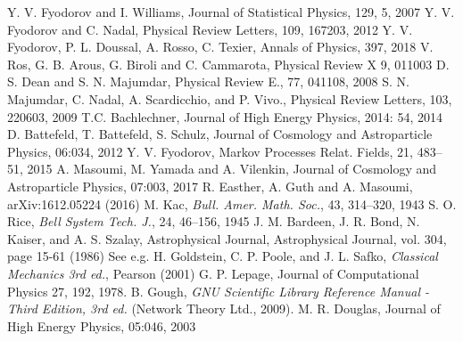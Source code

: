 \documentclass[12pt]{article}
\begin{document}
\begin{thebibliography}{99}
 Y. V. Fyodorov and I. Williams, Journal of Statistical Physics, 129, 5, 2007
 Y. V. Fyodorov and C. Nadal, Physical Review Letters, 109, 167203, 2012
 Y. V. Fyodorov, P. L. Doussal, A. Rosso, C. Texier, Annals of Physics, 397, 2018
  V. Ros, G. B. Arous, G. Biroli and C. Cammarota, Physical Review X 9, 011003
 D. S. Dean and S. N. Majumdar, Physical Review E., 77, 041108, 2008
 S. N. Majumdar, C. Nadal, A. Scardicchio, and P. Vivo., Physical Review Letters, 103, 220603, 2009
 T.C. Bachlechner, Journal of High Energy Physics, 2014: 54, 2014
 D. Battefeld, T. Battefeld, S. Schulz, Journal of Cosmology and Astroparticle Physics, 06:034, 2012
 Y. V. Fyodorov, Markov Processes Relat. Fields, 21, 483--51, 2015
 A. Masoumi, M. Yamada and A. Vilenkin, Journal of Cosmology and Astroparticle Physics, 07:003, 2017
 R. Easther, A. Guth and A. Masoumi, arXiv:1612.05224 (2016)
 M. Kac, \emph{Bull. Amer. Math. Soc.}, 43, 314–320, 1943
  S. O. Rice, \emph{Bell System Tech. J.}, 24, 46--156, 1945
 J. M. Bardeen, J. R. Bond, N. Kaiser, and A. S. Szalay, Astrophysical Journal, Astrophysical Journal, vol. 304, page 15-61 (1986)
 See e.g. H. Goldstein, C. P. Poole, and J. L. Safko, \emph{Classical Mechanics 3rd ed.}, Pearson (2001)
 G. P. Lepage, Journal of Computational Physics 27, 192, 1978.
 B. Gough, \emph{GNU Scientific Library Reference Manual - Third Edition, 3rd ed.} (Network Theory Ltd., 2009).
 M. R. Douglas, Journal of High Energy Physics, 05:046, 2003
\end{thebibliography}
\end{document}

